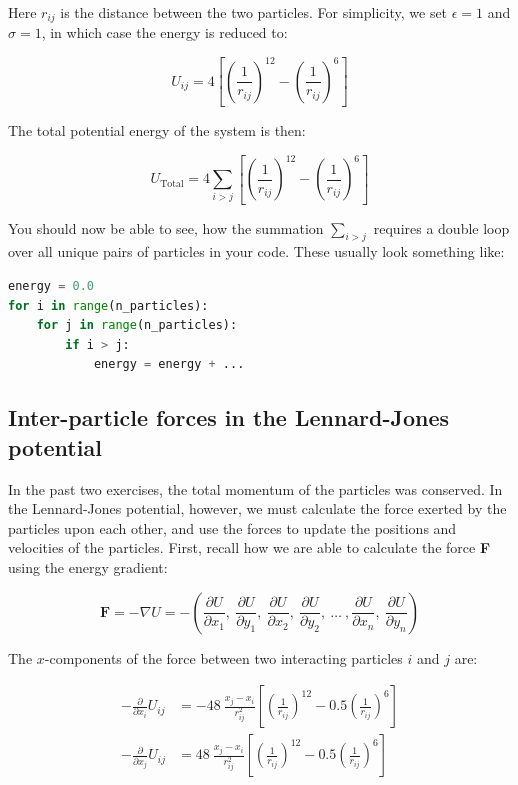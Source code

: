 \documentclass{article}
\begin{document}
Here $r_{ij}$ is the distance between the two particles. For simplicity, we
set $\epsilon = 1$ and $\sigma = 1$, in which case the energy is reduced
to:

\begin{equation}
    U_{ij} = 4 \left[ \left(\frac{1}{r_{ij}} \right)^{12} - \left(\frac{1}{r_{ij}} \right)^6 \right]
\end{equation}

The total potential energy of the system is then:

\begin{equation}
    U_{\mathrm{Total}} = 4 \sum_{i>j} \left[ \left(\frac{1}{r_{ij}} \right)^{12} - \left(\frac{1}{r_{ij}} \right)^6 \right]
\end{equation}

You should now be able to see, how the summation $\sum_{i>j}$ requires a double
loop over all unique pairs of particles in your code. These usually look
something like:

\begin{lstlisting}[language=python]
energy = 0.0
for i in range(n_particles):
    for j in range(n_particles):
        if i > j:
            energy = energy + ...
\end{lstlisting}

\subsection{Inter-particle forces in the Lennard-Jones potential}

In the past two exercises, the total momentum of the particles was conserved.
In the Lennard-Jones potential, however, we must calculate the force exerted by
the particles upon each other, and use the forces to update the positions and
velocities of the particles.
First, recall how we are able to calculate the force \textbf{F} using the
energy gradient:

\begin{equation}
    \mathbf{F} = -\nabla U = -\left( \frac{\partial U}{\partial x_1},\ \frac{\partial U}{\partial y_1},\  \frac{\partial U}{\partial x_2},\ \frac{\partial U}{\partial y_2},\ \ldots\ ,\frac{\partial U}{\partial x_n},\ \frac{\partial U}{\partial y_n}\right)
    \label{eq:force}
\end{equation}

The $x$-components of the force between two interacting particles $i$ and $j$
are:

\begin{align}
-\frac{\partial}{\partial x_i} U_{ij} &= -48\ \frac{x_j - x_i}{r^2_{ij}}\left[ \left(\frac{1}{r_{ij}} \right)^{12} - 0.5 \left(\frac{1}{r_{ij}} \right)^6 \right] \label{eq:velo_pos} \\
-\frac{\partial}{\partial x_j} U_{ij} &=  48\ \frac{x_j - x_i}{r^2_{ij}}\left[ \left(\frac{1}{r_{ij}} \right)^{12} - 0.5 \left(\frac{1}{r_{ij}} \right)^6 \right]
\end{align}
\end{document}
